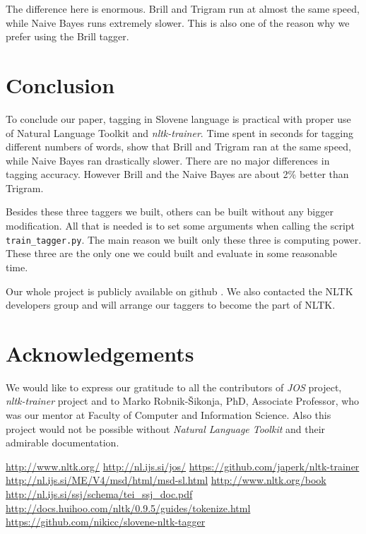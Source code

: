 \documentclass[10pt, conference, compsocconf]{IEEEtran}
\begin{document}
The difference here is enormous. Brill and Trigram run at almost the same speed, while Naive Bayes runs extremely slower. This is also one of the reason why we prefer using the Brill tagger. 

\section{Conclusion} %
To conclude our paper, tagging in Slovene language is practical with proper use of Natural Language Toolkit and \textit{nltk-trainer}. Time spent in seconds for tagging different numbers of words, show that Brill and Trigram ran at the same speed, while Naive Bayes ran drastically slower. There are no major differences in tagging accuracy. However Brill and the Naive Bayes are about 2\% better than Trigram.
\par
Besides these three taggers we built, others can be built without any bigger modification. All that is needed is to set some arguments when calling the script \texttt{train\_tagger.py}. The main reason we built only these three is computing power. These three are the only one we could built and evaluate in some reasonable time.
\par
Our whole project is publicly available on github \cite{CODE}. We also contacted the NLTK developers group and will arrange our taggers to become the part of NLTK.

\section*{Acknowledgements}
We would like to express our gratitude to all the contributors of \textit{JOS} \cite{JOS} project, \textit{nltk-trainer} \cite{nltk-trainer} project and to Marko Robnik-Šikonja, PhD, Associate Professor, who was our mentor at Faculty of Computer and Information Science. Also this project would not be possible without \textit{Natural Language Toolkit} \cite{nltk} and their admirable documentation.

\begin{thebibliography}{99}
 \url{http://www.nltk.org/}
 \url{http://nl.ijs.si/jos/}
 \url{https://github.com/japerk/nltk-trainer}
 \url{http://nl.ijs.si/ME/V4/msd/html/msd-sl.html}
 \url{http://www.nltk.org/book}
 \url{http://nl.ijs.si/ssj/schema/tei_ssj_doc.pdf}
 \url{http://docs.huihoo.com/nltk/0.9.5/guides/tokenize.html}
 \url{https://github.com/nikicc/slovene-nltk-tagger}
\end{thebibliography}
\end{document}

